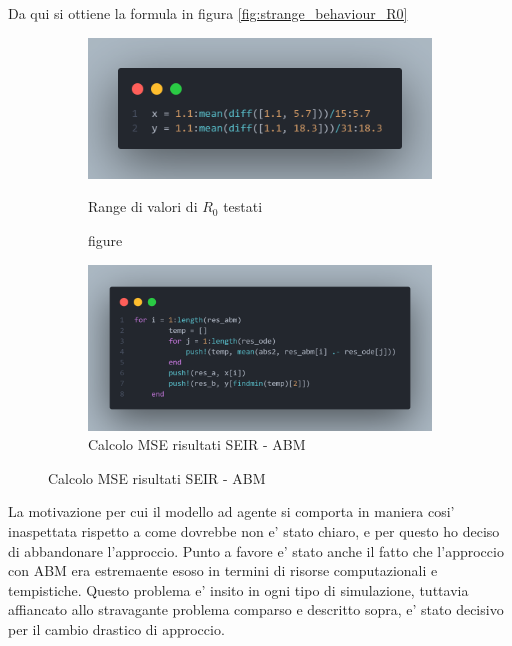 Da qui si ottiene la formula in figura \ref{fig:strange_behaviour_R0}

\begin{figure}[!hb]
	\centering
	\begin{subfigure}[b]{0.45\textwidth}
		\centering
		\includegraphics[width=\textwidth]{img/r0_range_test.png}
    	\caption{figure}{Range di valori di $R_0$ testati}
    	\label{fig:r0_range_test}
	\end{subfigure}
	\hfill
	\begin{subfigure}[b]{0.45\textwidth}
		\centering
		\includegraphics[width=\textwidth]{img/mse_r0.png}
		\caption{Calcolo MSE risultati SEIR - ABM}
		\label{fig:mse_r0}
	\end{subfigure}
\end{figure}

La motivazione per cui il modello ad agente si comporta in maniera cosi' inaspettata
rispetto a come dovrebbe non e' stato chiaro, e per questo ho deciso di abbandonare l'approccio.
Punto a favore e' stato anche il fatto che l'approccio con ABM era estremaente esoso in termini 
di risorse computazionali e tempistiche. Questo problema e' insito in ogni tipo di simulazione, 
tuttavia affiancato allo stravagante problema comparso e descritto sopra, e' stato 
decisivo per il cambio drastico di approccio. 